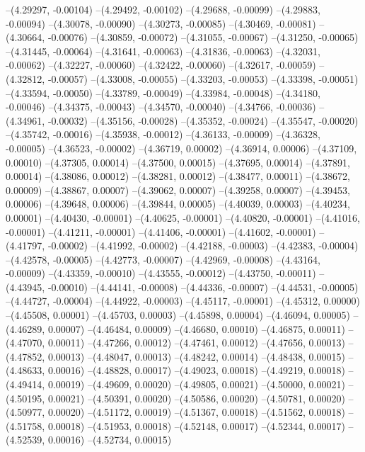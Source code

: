 --(4.29297, -0.00104)
--(4.29492, -0.00102)
--(4.29688, -0.00099)
--(4.29883, -0.00094)
--(4.30078, -0.00090)
--(4.30273, -0.00085)
--(4.30469, -0.00081)
--(4.30664, -0.00076)
--(4.30859, -0.00072)
--(4.31055, -0.00067)
--(4.31250, -0.00065)
--(4.31445, -0.00064)
--(4.31641, -0.00063)
--(4.31836, -0.00063)
--(4.32031, -0.00062)
--(4.32227, -0.00060)
--(4.32422, -0.00060)
--(4.32617, -0.00059)
--(4.32812, -0.00057)
--(4.33008, -0.00055)
--(4.33203, -0.00053)
--(4.33398, -0.00051)
--(4.33594, -0.00050)
--(4.33789, -0.00049)
--(4.33984, -0.00048)
--(4.34180, -0.00046)
--(4.34375, -0.00043)
--(4.34570, -0.00040)
--(4.34766, -0.00036)
--(4.34961, -0.00032)
--(4.35156, -0.00028)
--(4.35352, -0.00024)
--(4.35547, -0.00020)
--(4.35742, -0.00016)
--(4.35938, -0.00012)
--(4.36133, -0.00009)
--(4.36328, -0.00005)
--(4.36523, -0.00002)
--(4.36719, 0.00002)
--(4.36914, 0.00006)
--(4.37109, 0.00010)
--(4.37305, 0.00014)
--(4.37500, 0.00015)
--(4.37695, 0.00014)
--(4.37891, 0.00014)
--(4.38086, 0.00012)
--(4.38281, 0.00012)
--(4.38477, 0.00011)
--(4.38672, 0.00009)
--(4.38867, 0.00007)
--(4.39062, 0.00007)
--(4.39258, 0.00007)
--(4.39453, 0.00006)
--(4.39648, 0.00006)
--(4.39844, 0.00005)
--(4.40039, 0.00003)
--(4.40234, 0.00001)
--(4.40430, -0.00001)
--(4.40625, -0.00001)
--(4.40820, -0.00001)
--(4.41016, -0.00001)
--(4.41211, -0.00001)
--(4.41406, -0.00001)
--(4.41602, -0.00001)
--(4.41797, -0.00002)
--(4.41992, -0.00002)
--(4.42188, -0.00003)
--(4.42383, -0.00004)
--(4.42578, -0.00005)
--(4.42773, -0.00007)
--(4.42969, -0.00008)
--(4.43164, -0.00009)
--(4.43359, -0.00010)
--(4.43555, -0.00012)
--(4.43750, -0.00011)
--(4.43945, -0.00010)
--(4.44141, -0.00008)
--(4.44336, -0.00007)
--(4.44531, -0.00005)
--(4.44727, -0.00004)
--(4.44922, -0.00003)
--(4.45117, -0.00001)
--(4.45312, 0.00000)
--(4.45508, 0.00001)
--(4.45703, 0.00003)
--(4.45898, 0.00004)
--(4.46094, 0.00005)
--(4.46289, 0.00007)
--(4.46484, 0.00009)
--(4.46680, 0.00010)
--(4.46875, 0.00011)
--(4.47070, 0.00011)
--(4.47266, 0.00012)
--(4.47461, 0.00012)
--(4.47656, 0.00013)
--(4.47852, 0.00013)
--(4.48047, 0.00013)
--(4.48242, 0.00014)
--(4.48438, 0.00015)
--(4.48633, 0.00016)
--(4.48828, 0.00017)
--(4.49023, 0.00018)
--(4.49219, 0.00018)
--(4.49414, 0.00019)
--(4.49609, 0.00020)
--(4.49805, 0.00021)
--(4.50000, 0.00021)
--(4.50195, 0.00021)
--(4.50391, 0.00020)
--(4.50586, 0.00020)
--(4.50781, 0.00020)
--(4.50977, 0.00020)
--(4.51172, 0.00019)
--(4.51367, 0.00018)
--(4.51562, 0.00018)
--(4.51758, 0.00018)
--(4.51953, 0.00018)
--(4.52148, 0.00017)
--(4.52344, 0.00017)
--(4.52539, 0.00016)
--(4.52734, 0.00015)
